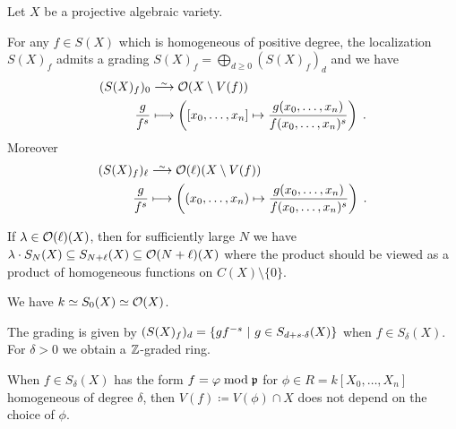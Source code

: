 \documentclass[a4paper,parskip=half,numbers=enddot, DIV=12, headheight=30pt]{scrreprt}
\begin{document}
\begin{thm}
    Let $X$ be a projective algebraic variety. 
    \begin{alphanumerate}    
      \item 
        For any $f\in S(X)$ which is homogeneous of positive degree, the localization $S(X)_f$ admits a grading $S(X)_f=\bigoplus_{d\geq 0}(S(X)_f)_d$  and we have
        \begin{align*}
            (S(X)_f)_0 &\isomorphism \Oo(X\setminus V(f))\\
            \frac{g}{f^s} &\longmapsto \left([x_0,\ldots,x_n] \mapsto \frac{g(x_0,\ldots,x_n)}{f(x_0,\ldots, x_n)^s}\right)\;.
        \end{align*}
        Moreover
        \begin{align*}
            (S(X)_f)_\ell &\isomorphism \Oo(\ell)(X\setminus V(f)) \\
            \frac{g}{f^s} &\longmapsto \left((x_0,\ldots,x_n) \mapsto \frac{g(x_0,\ldots,x_n)}{f(x_0,\ldots, x_n)^s}\right)\;.
        \end{align*}
      \item 
        If $\lambda\in\mathcal{O}(\ell)(X)$, then for sufficiently large $N$ we have $\lambda\cdot S_N(X)\subseteq S_{N+\ell}(X)\subseteq \mathcal{O}(N+\ell)(X)$ where the product should be viewed as a product of homogeneous functions on $C(X)\setminus \{0\}$.
      \item 
         We have $k\simeq S_0(X)\simeq\mathcal{O}(X)$.
    \end{alphanumerate}
\end{thm}
\begin{rem*}
    \begin{alphanumerate}
        \item 
            The grading is given by $(S(X)_f)_d =\left\{gf^{-s}\ \middle|\  g\in S_{d+s\cdot \delta}(X)\right\}$ when $f\in S_\delta(X)$. For $\delta>0$ we obtain a $\mathbb{Z}$-graded ring.
        \item 
            When $f\in S_\delta(X)$ has the form $f=\varphi \bmod \mathfrak{p}$ for $\phi \in R = k[X_0,\ldots, X_n]$ homogeneous of degree $\delta$, then $V(f)\coloneqq V(\phi)\cap X$ does not depend on the choice of $\phi$.
    \end{alphanumerate}
\end{rem*}
\end{document}
